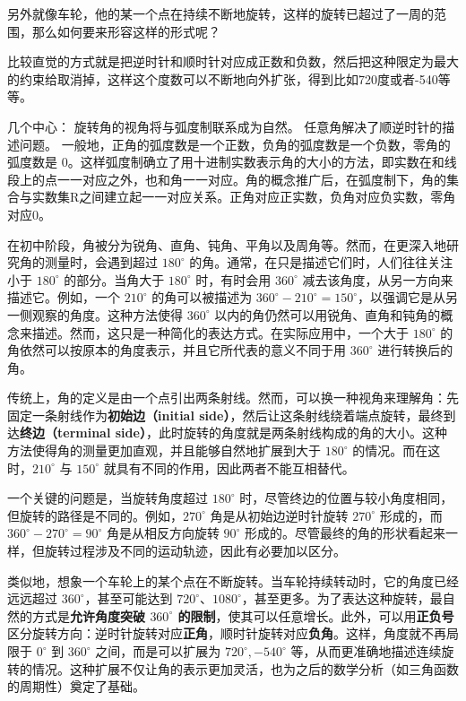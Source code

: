另外就像车轮，他的某一个点在持续不断地旋转，这样的旋转已超过了一周的范围，那么如何要来形容这样的形式呢？

比较直觉的方式就是把逆时针和顺时针对应成正数和负数，然后把这种限定为最大的约束给取消掉，这样这个度数可以不断地向外扩张，得到比如720度或者-540等等。

几个中心：
旋转角的视角将与弧度制联系成为自然。
任意角解决了顺逆时针的描述问题。
一般地，正角的弧度数是一个正数，负角的弧度数是一个负数，零角的弧度数是 $0$。这样弧度制确立了用十进制实数表示角的大小的方法，即实数在和线段上的点一一对应之外，也和角一一对应。角的概念推广后，在弧度制下，角的集合与实数集R之间建立起一一对应关系。正角对应正实数，负角对应负实数，零角对应0。




在初中阶段，角被分为锐角、直角、钝角、平角以及周角等。然而，在更深入地研究角的测量时，会遇到超过 $180^\circ$ 的角。通常，在只是描述它们时，人们往往关注小于 $180^\circ$ 的部分。当角大于 $180^\circ$ 时，有时会用 $360^\circ$ 减去该角度，从另一方向来描述它。例如，一个 $210^\circ$ 的角可以被描述为 $360^\circ - 210^\circ = 150^\circ$，以强调它是从另一侧观察的角度。这种方法使得 $360^\circ$ 以内的角仍然可以用锐角、直角和钝角的概念来描述。然而，这只是一种简化的表达方式。在实际应用中，一个大于 $180^\circ$ 的角依然可以按原本的角度表示，并且它所代表的意义不同于用 $360^\circ$ 进行转换后的角。

传统上，角的定义是由一个点引出两条射线。然而，可以换一种视角来理解角：先固定一条射线作为\textbf{初始边（initial side）}，然后让这条射线绕着端点旋转，最终到达\textbf{终边（terminal side）}，此时旋转的角度就是两条射线构成的角的大小。这种方法使得角的测量更加直观，并且能够自然地扩展到大于 $180^\circ$ 的情况。而在这时，$210^\circ$ 与 $150^\circ$ 就具有不同的作用，因此两者不能互相替代。


一个关键的问题是，当旋转角度超过 $180^\circ$ 时，尽管终边的位置与较小角度相同，但旋转的路径是不同的。例如，$270^\circ$ 角是从初始边逆时针旋转 $270^\circ$ 形成的，而 $360^\circ - 270^\circ = 90^\circ$ 角是从相反方向旋转 $90^\circ$ 形成的。尽管最终的角的形状看起来一样，但旋转过程涉及不同的运动轨迹，因此有必要加以区分。

类似地，想象一个车轮上的某个点在不断旋转。当车轮持续转动时，它的角度已经远远超过 $360^\circ$，甚至可能达到 $720^\circ$、$1080^\circ$，甚至更多。为了表达这种旋转，最自然的方式是\textbf{允许角度突破 $360^\circ$ 的限制}，使其可以任意增长。此外，可以用\textbf{正负号}区分旋转方向：逆时针旋转对应\textbf{正角}，顺时针旋转对应\textbf{负角}。这样，角度就不再局限于 $0^\circ$ 到 $360^\circ$ 之间，而是可以扩展为 $720^\circ, -540^\circ$ 等，从而更准确地描述连续旋转的情况。这种扩展不仅让角的表示更加灵活，也为之后的数学分析（如三角函数的周期性）奠定了基础。


